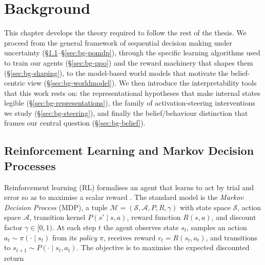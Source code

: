 
\chapter{Background}
\label{ch:background}

This chapter develops the theory required to follow the rest of the thesis. We
proceed from the general framework of sequential decision making under
uncertainty (\S\ref{sec:bg-rl}--\S\ref{sec:bg-pomdp}), through the specific
learning algorithms used to train our agents (\S\ref{sec:bg-ppo}) and the reward
machinery that shapes them (\S\ref{sec:bg-shaping}), to the model-based world
models that motivate the belief-centric view (\S\ref{sec:bg-worldmodel}).
We then introduce the interpretability tools that this work rests on: the
representational hypotheses that make internal states legible
(\S\ref{sec:bg-representations}), the family of activation-steering interventions
we study (\S\ref{sec:bg-steering}), and finally the belief/behaviour distinction
that frames our central question (\S\ref{sec:bg-belief}).

\section{Reinforcement Learning and Markov Decision Processes}
\label{sec:bg-rl}

Reinforcement learning (RL) formalises an agent that learns to act by trial and
error so as to maximise a scalar reward \citep{sutton2018reinforcement}. The
standard model is the \emph{Markov Decision Process} (MDP), a tuple
$\mathcal{M} = (\mathcal{S}, \mathcal{A}, P, R, \gamma)$ with state space
$\mathcal{S}$, action space $\mathcal{A}$, transition kernel
$P(s' \mid s, a)$, reward function $R(s,a)$, and discount factor
$\gamma \in [0,1)$. At each step $t$ the agent observes state $s_t$, samples an
action $a_t \sim \pi(\cdot \mid s_t)$ from its \emph{policy} $\pi$, receives
reward $r_t = R(s_t, a_t)$, and transitions to $s_{t+1} \sim P(\cdot \mid s_t,
a_t)$. The objective is to maximise the expected discounted return

